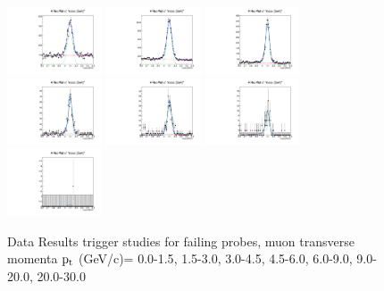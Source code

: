 \documentclass{article}
\begin{document}
\begin{figure}
    \includegraphics[width=0.25\textwidth]{../PlotsRooFitData/croofit_trg_fail_0.pdf}
    \includegraphics[width=0.25\textwidth]{../PlotsRooFitData/croofit_trg_fail_1.pdf}
    \includegraphics[width=0.25\textwidth]{../PlotsRooFitData/croofit_trg_fail_2.pdf}
    \includegraphics[width=0.25\textwidth]{../PlotsRooFitData/croofit_trg_fail_3.pdf}
    \includegraphics[width=0.25\textwidth]{../PlotsRooFitData/croofit_trg_fail_4.pdf}
    \includegraphics[width=0.25\textwidth]{../PlotsRooFitData/croofit_trg_fail_5.pdf}
    \includegraphics[width=0.25\textwidth]{../PlotsRooFitData/croofit_trg_fail_6.pdf}
    \caption{Data Results trigger studies for failing probes, muon transverse momenta
    $\rm p_{t}$ (GeV/c)= {0.0-1.5}, {1.5-3.0}, {3.0-4.5}, {4.5-6.0}, 
    {6.0-9.0}, {9.0-20.0}, {20.0-30.0}}
\end{figure}
\end{document}
